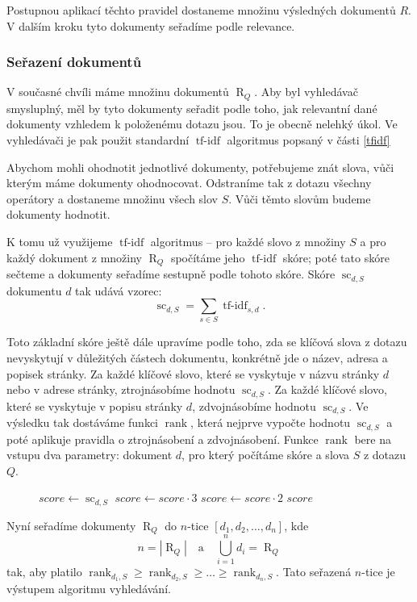 \documentclass[12pt]{article}
\newcommand{\sssection}[1]{\subsubsection{#1}}
\newcommand{\addh}[1]{\left[#1\right]}
\DeclareMathOperator{\tfidf}{tf-idf}
\DeclareMathOperator{\score}{sc}
\DeclareMathOperator{\getdocs}{R}
\DeclareMathOperator{\rank}{rank}
\begin{document}
Postupnou aplikací těchto pravidel dostaneme množinu výsledných dokumentů $R$. V dalším kroku tyto dokumenty seřadíme podle relevance. 

\sssection{Seřazení dokumentů}

V současné chvíli máme množinu dokumentů $\getdocs_Q$. Aby byl vyhledávač smysluplný, měl by tyto dokumenty seřadit podle toho, jak relevantní dané dokumenty vzhledem k položenému dotazu jsou. To je obecně nelehký úkol. Ve vyhledávači je pak použit standardní $\tfidf$ algoritmus popsaný v části \ref{tfidf}

Abychom mohli ohodnotit jednotlivé dokumenty, potřebujeme znát slova, vůči kterým máme dokumenty ohodnocovat. Odstraníme tak z dotazu všechny operátory a dostaneme množinu všech slov $S$. Vůči těmto slovům budeme dokumenty hodnotit. 

K tomu už využijeme $\tfidf$ algoritmus -- pro každé slovo z množiny $S$ a pro každý dokument z množiny $\getdocs_Q$ spočítáme jeho $\tfidf$ skóre; poté tato skóre sečteme a dokumenty seřadíme sestupně podle tohoto skóre. Skóre $\score_{d,S}$ dokumentu $d$ tak udává vzorec:
$$\score_{d,S}=\sum_{s\in S} \tfidf_{s, d}.$$

Toto základní skóre ještě dále upravíme podle toho, zda se klíčová slova z dotazu nevyskytují v důležitých částech dokumentu, konkrétně jde o název, adresa a popisek stránky. Za každé klíčové slovo, které se vyskytuje v názvu stránky $d$ nebo v adrese stránky, ztrojnásobíme hodnotu $\score_{d,S}$. Za každé klíčové slovo, které se vyskytuje v popisu stránky $d$, zdvojnásobíme hodnotu $\score_{d,S}$. Ve výsledku tak dostáváme funkci $\rank$, která nejprve vypočte hodnotu $\score_{d,S}$ a poté aplikuje pravidla o ztrojnásobení a zdvojnásobení. Funkce $\rank$ bere na vstupu dva parametry: dokument $d$, pro který počítáme skóre a slova $S$ z dotazu $Q$.

\begin{figure}
\begin{algorithmic}[1]
    \State $score \gets \score_{d, S}$
    		\State $score \gets score \cdot 3$
    	\EndIf
    		\State $score \gets score \cdot 2$
    	\EndIf
    \EndFor
    \State \Return $score$
\EndFunction
\end{algorithmic}
\end{figure}



Nyní seřadíme dokumenty $\getdocs_Q$ do $n$-tice $\addh{d_1, d_2, \ldots, d_n}$, kde 
$$n=\left|\getdocs_Q\right|\quad\mbox{a}\quad \bigcup_{i=1}^n d_i=\getdocs_Q$$ 
tak, aby platilo $\rank_{d_1, S} \ge \rank_{d_2, S} \ge \ldots \ge \rank_{d_n, S}$. Tato seřazená $n$-tice je výstupem algoritmu vyhledávání.
\end{document}
